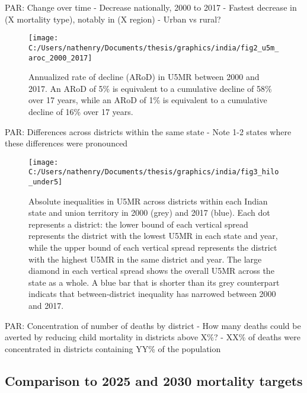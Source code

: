 \documentclass[
]{article}
\begin{document}
PAR: Change over time
- Decrease nationally, 2000 to 2017
- Fastest decrease in (X mortality type), notably in (X region)
- Urban vs rural?

\begin{figure}[!hbt]

{\centering \texttt{[image: C:/Users/nathenry/Documents/thesis/graphics/india/fig2\_u5m\_aroc\_2000\_2017]} 

}

\caption{Annualized rate of decline (ARoD) in U5MR between 2000 and 2017. An ARoD of 5\% is equivalent to a cumulative decline of 58\% over 17 years, while an ARoD of 1\% is equivalent to a cumulative decline of 16\% over 17 years.}\label{fig:aroc}
\end{figure}

PAR: Differences across districts within the same state
- Note 1-2 states where these differences were pronounced

\begin{figure}[!hbt]

{\centering \texttt{[image: C:/Users/nathenry/Documents/thesis/graphics/india/fig3\_hilo\_under5]} 

}

\caption{Absolute inequalities in U5MR across districts within each Indian state and union territory in 2000 (grey) and 2017 (blue). Each dot represents a district: the lower bound of each vertical spread represents the district with the lowest U5MR in each state and year, while the upper bound of each vertical spread represents the district with the highest U5MR in the same district and year. The large diamond in each vertical spread shows the overall U5MR across the state as a whole. A blue bar that is shorter than its grey counterpart indicats that between-district inequality has narrowed between 2000 and 2017.}\label{fig:hilo}
\end{figure}

PAR: Concentration of number of deaths by district
- How many deaths could be averted by reducing child mortality in districts above X\%?
- XX\% of deaths were concentrated in districts containing YY\% of the population

\hypertarget{comparison-to-2025-and-2030-mortality-targets}{%
\subsection{Comparison to 2025 and 2030 mortality targets}\label{comparison-to-2025-and-2030-mortality-targets}}
\end{document}
